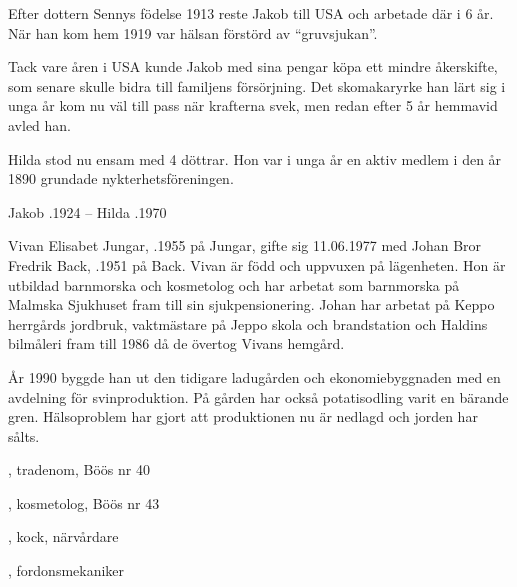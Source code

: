 Efter dottern Sennys födelse 1913 reste Jakob till USA och arbetade där i 6 år. När han kom hem 1919 var hälsan förstörd av ``gruvsjukan''.

Tack vare åren i USA kunde Jakob med sina pengar köpa ett mindre åkerskifte, som senare skulle bidra till familjens försörjning. Det skomakaryrke han lärt sig i unga år kom nu väl till pass när krafterna svek, men redan efter 5 år hemmavid avled han.

Hilda stod nu ensam med 4 döttrar. Hon var i unga år en aktiv medlem i den år 1890 grundade nykterhetsföreningen.
\begin{jhchildren}
  \item {}
  \item {}
  \item {}
  \item {}
    \item {}
\end{jhchildren}
Jakob .1924  --  Hilda .1970




Vivan Elisabet Jungar, .1955 på Jungar, gifte sig 11.06.1977 med Johan Bror Fredrik Back, .1951 på Back. Vivan är född och uppvuxen på lägenheten. Hon är utbildad barnmorska och kosmetolog och har arbetat som barnmorska på Malmska Sjukhuset fram till sin sjukpensionering. Johan har arbetat på Keppo herrgårds jordbruk, vaktmästare på Jeppo skola och brandstation och Haldins bilmåleri fram till 1986 då de övertog Vivans hemgård.

År 1990 byggde han ut den tidigare ladugården och ekonomiebyggnaden med en avdelning för svinproduktion. På gården har också potatisodling varit en bärande gren. Hälsoproblem har gjort att produktionen nu är nedlagd och jorden har sålts.
\begin{jhchildren}
  \item {}, tradenom, Böös nr 40
  \item {}, kosmetolog, Böös nr 43
  \item {}, kock, närvårdare
  \item {}, fordonsmekaniker
\end{jhchildren}


